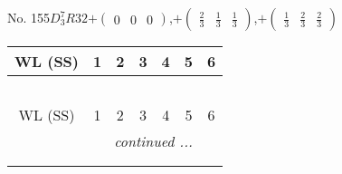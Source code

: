 \documentclass[fleqn,9pt,landscape]{jsarticle}
\begin{document}
\newpage
No. 155\quad$D_{3}^{7}$\quad$R32$\quad[ trigonal ]\quad$+\begin{pmatrix} 0 & 0 & 0 \end{pmatrix}$,\quad $+\begin{pmatrix} \frac{2}{3} & \frac{1}{3} & \frac{1}{3} \end{pmatrix}$,\quad $+\begin{pmatrix} \frac{1}{3} & \frac{2}{3} & \frac{2}{3} \end{pmatrix}$
\begin{center}
\renewcommand{\arraystretch}{1.2}
\begin{longtable}{ccccccc}
 \hline \hline
WL (SS) & 1 & 2 & 3 & 4 & 5 & 6 \\ \hline \endfirsthead

\multicolumn{6}{l}{\tablename\ \thetable{}} \\
 \hline \hline
WL (SS) & 1 & 2 & 3 & 4 & 5 & 6 \\ \hline \endhead

 \hline \hline
\multicolumn{6}{r}{\footnotesize\it continued ...} \\ \endfoot

 \hline \hline
\multicolumn{6}{r}{} \\ \endlastfoot


\end{longtable}
\end{center}
\end{document}
